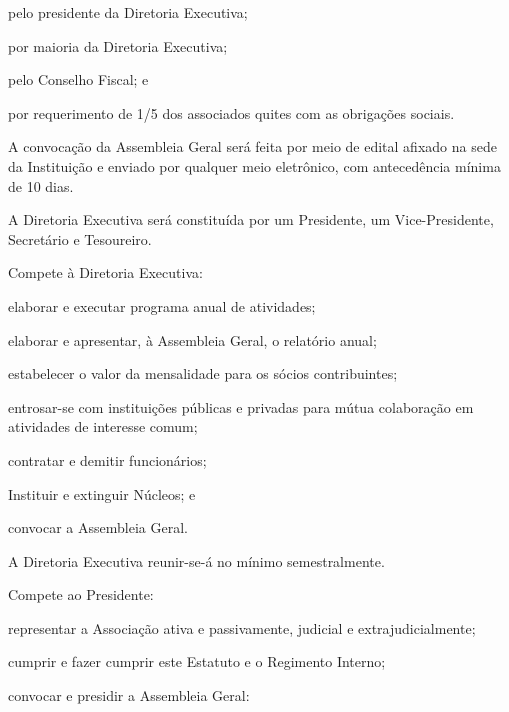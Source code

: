\documentclass{estatuto}
\begin{document}
\begin{artigos}
\begin{itens}
					\item pelo presidente da Diretoria Executiva;
					\item por maioria da Diretoria Executiva;
					\item pelo Conselho Fiscal; e
					\item por requerimento de 1/5 dos associados quites com as obrigações sociais.
				\end{itens}
			\item A convocação da Assembleia Geral será feita por meio de edital afixado na sede da Instituição e enviado por qualquer meio eletrônico, com antecedência mínima de 10 dias.
			\item A Diretoria Executiva será constituída por um Presidente, um Vice-Presidente, Secretário e Tesoureiro.
			\item Compete à Diretoria Executiva:
				\begin{itens}
					\item elaborar e executar programa anual de atividades;
					\item elaborar e apresentar, à Assembleia Geral, o relatório anual;
					\item estabelecer o valor da mensalidade para os sócios contribuintes;
					\item entrosar-se com instituições públicas e privadas para mútua colaboração em atividades de interesse comum;
					\item contratar e demitir funcionários;
					\item Instituir e extinguir Núcleos; e
					\item convocar a Assembleia Geral.
				\end{itens}
			\item A Diretoria Executiva reunir-se-á no mínimo semestralmente.
			\item Compete ao Presidente:
				\begin{itens}
					\item representar a Associação ativa e passivamente, judicial e extrajudicialmente;
					\item cumprir e fazer cumprir este Estatuto e o Regimento Interno;
					\item convocar e presidir a Assembleia Geral:

\end{itens}
\end{artigos}
\end{document}
